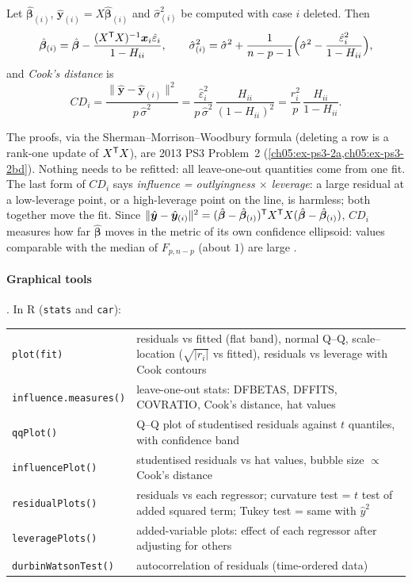 \begin{paracol}{2}
\begin{proposition}\label{ch05:prop-deletion}
Let $\hat{\bm\beta}_{(i)}$, $\hat{\bm y}_{(i)}=X\hat{\bm\beta}_{(i)}$ and $\hat\sigma^2_{(i)}$ be computed with case $i$ deleted. Then
\[
  \hat{\bm\beta}_{(i)}=\hat{\bm\beta}-\frac{(X^{\mathsf T} X)^{-1}\bm x_i\hat\varepsilon_i}{1-H_{ii}},\qquad
  \hat\sigma^2_{(i)}=\hat\sigma^2+\frac{1}{n-p-1}\Bigl(\hat\sigma^2-\frac{\hat\varepsilon_i^2}{1-H_{ii}}\Bigr),
\]
and \emph{Cook's distance} is
\[
  CD_i=\frac{\|\hat{\bm y}-\hat{\bm y}_{(i)}\|^2}{p\,\hat\sigma^2}=\frac{\hat\varepsilon_i^2}{p\,\hat\sigma^2}\,\frac{H_{ii}}{(1-H_{ii})^2}
  =\frac{r_i^2}{p}\,\frac{H_{ii}}{1-H_{ii}} .
\]
\end{proposition}
The proofs, via the Sherman--Morrison--Woodbury formula (deleting a row is a rank-one update of $X^{\mathsf T} X$), are 2013 PS3
Problem~2 (\cref{ch05:ex-ps3-2a,ch05:ex-ps3-2bd}). Nothing needs to be refitted: all leave-one-out quantities come
from one fit. The last form of $CD_i$ says \emph{influence = outlyingness $\times$ leverage}: a large residual at a
low-leverage point, or a high-leverage point on the line, is harmless; both together move the fit. Since
$\|\hat{\bm y}-\hat{\bm y}_{(i)}\|^2=(\hat{\bm\beta}-\hat{\bm\beta}_{(i)})^{\mathsf T} X^{\mathsf T} X(\hat{\bm\beta}-\hat{\bm\beta}_{(i)})$, $CD_i$ measures how far $\hat{\bm\beta}$ moves in the metric of
its own confidence ellipsoid: values comparable with the median of $F_{p,n-p}$ (about $1$) are large
.

\paragraph{Graphical tools} . In R (\texttt{stats} and
\texttt{car}):
\begin{center}
\small
\begin{tabularx}{\linewidth}{@{}l L@{}}
\toprule
\texttt{plot(fit)} & residuals vs fitted (flat band), normal Q--Q,
scale--location ($\sqrt{|r_i|}$ vs fitted), residuals vs leverage
with Cook contours\\
\texttt{influence.measures()} & leave-one-out stats: DFBETAS,
DFFITS, COVRATIO, Cook's distance, hat values\\
\texttt{qqPlot()} & Q--Q plot of studentised residuals against
$t$ quantiles, with confidence band \\
\texttt{influencePlot()} & studentised residuals vs hat values,
bubble size $\propto$ Cook's distance\\
\texttt{residualPlots()} & residuals vs each regressor; curvature
test = $t$ test of added squared term; Tukey test = same with
$\hat y^2$ \\
\texttt{leveragePlots()} & added-variable plots: effect of each
regressor after adjusting for others\\
\texttt{durbinWatsonTest()} & autocorrelation of residuals
(time-ordered data)\\
\bottomrule
\end{tabularx}
\end{center}


\end{paracol}

